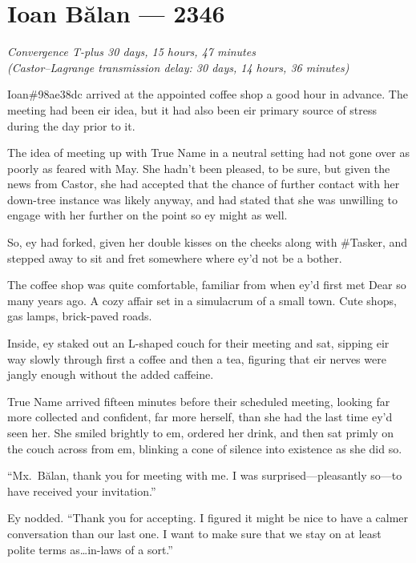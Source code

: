 \hypertarget{ioan-bux103lan-2346}{%
\chapter{Ioan Bălan — 2346}}

\begin{center}
\emph{Convergence T-plus 30 days, 15 hours, 47 minutes}\\
\emph{(Castor--Lagrange transmission delay: 30 days, 14 hours, 36 minutes)}
\end{center}

\noindent Ioan\#98ae38dc arrived at the appointed coffee shop a good hour in advance. The meeting had been eir idea, but it had also been eir primary source of stress during the day prior to it.

The idea of meeting up with True Name in a neutral setting had not gone over as poorly as feared with May. She hadn't been pleased, to be sure, but given the news from Castor, she had accepted that the chance of further contact with her down-tree instance was likely anyway, and had stated that she was unwilling to engage with her further on the point so ey might as well.

So, ey had forked, given her double kisses on the cheeks along with \#Tasker, and stepped away to sit and fret somewhere where ey'd not be a bother.

The coffee shop was quite comfortable, familiar from when ey'd first met Dear so many years ago. A cozy affair set in a simulacrum of a small town. Cute shops, gas lamps, brick-paved roads.

Inside, ey staked out an L-shaped couch for their meeting and sat, sipping eir way slowly through first a coffee and then a tea, figuring that eir nerves were jangly enough without the added caffeine.

True Name arrived fifteen minutes before their scheduled meeting, looking far more collected and confident, far more herself, than she had the last time ey'd seen her. She smiled brightly to em, ordered her drink, and then sat primly on the couch across from em, blinking a cone of silence into existence as she did so.

``Mx.~Bălan, thank you for meeting with me. I was surprised—pleasantly so—to have received your invitation.''

Ey nodded. ``Thank you for accepting. I figured it might be nice to have a calmer conversation than our last one. I want to make sure that we stay on at least polite terms as\ldots in-laws of a sort.''

